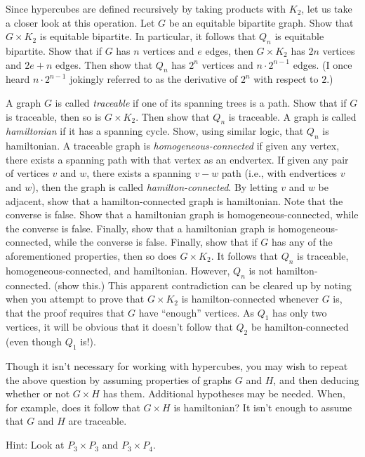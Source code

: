 \documentclass{article}
\begin{document}
\begin{description}
  Since hypercubes are defined recursively by taking products with $K_2$, let us take a closer look at this operation. Let $G$ be an equitable bipartite graph. Show that $G \times K_2$ is equitable bipartite. In particular, it follows that $Q_n$ is equitable bipartite. Show that if $G$ has $n$ vertices and $e$ edges, then $G \times K_2$ has $2n$ vertices and $2e+n$ edges. Then show that $Q_n$ has $2^n$ vertices and $n \cdot 2^{n-1}$ edges. (I once heard $n \cdot 2^{n-1}$ jokingly referred to as the derivative of $2^n$ with respect to $2$.)

  A graph $G$ is called \emph{traceable} if one of its spanning trees is a path. Show that if $G$ is traceable, then so is $G \times K_2$. Then show that $Q_n$ is traceable. A graph is called \emph{hamiltonian} if it has a spanning cycle. Show, using similar logic, that $Q_n$ is hamiltonian. A traceable graph is \emph{homogeneous-connected} if given any vertex, there exists a spanning path with that vertex as an endvertex. If given any pair of vertices $v$ and $w$, there exists a spanning $v-w$ path (i.e., with endvertices $v$ and $w$), then the graph is called \emph{hamilton-connected}. By letting $v$ and $w$ be adjacent, show that a hamilton-connected graph is hamiltonian. Note that the converse is false. Show that a hamiltonian graph is homogeneous-connected, while the converse is false. Finally, show that a hamiltonian graph is homogeneous-connected, while the converse is false. Finally, show that if $G$ has any of the aforementioned properties, then so does $G \times K_2$. It follows that $Q_n$ is traceable, homogeneous-connected, and hamiltonian. However, $Q_n$ is not hamilton-connected. (show this.) This apparent contradiction can be cleared up by noting when you attempt to prove that $G \times K_2$ is hamilton-connected whenever $G$ is, that the proof requires that $G$ have ``enough'' vertices. As $Q_1$ has only two vertices, it will be obvious that it doesn't follow that $Q_2$ be hamilton-connected (even though $Q_1$ is!).

  Though it isn't necessary for working with hypercubes, you may wish to repeat the above question by assuming properties of graphs $G$ and $H$, and then deducing whether or not $G \times H$ has them. Additional hypotheses may be needed. When, for example, does it follow that $G \times H$ is hamiltonian? It isn't enough to assume that $G$ and $H$ are traceable.

  Hint: Look at $P_3 \times P_3$ and $P_3 \times P_4$.


\end{description}
\end{document}
